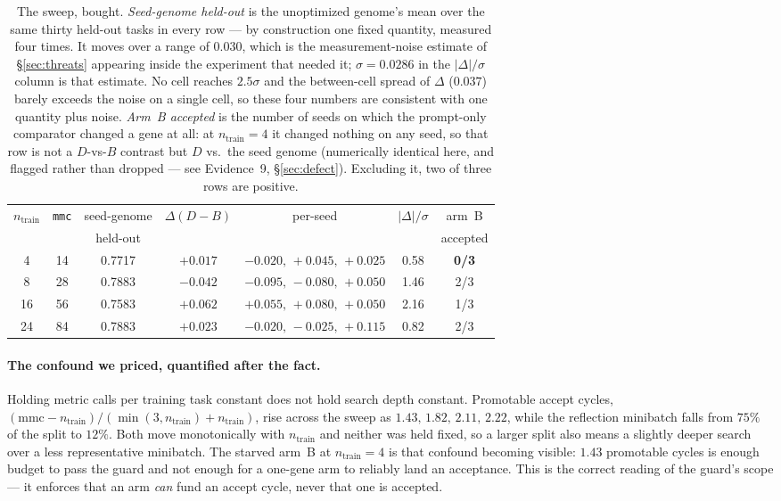 \documentclass[11pt]{article}
\newcommand{\dd}{\ensuremath{\Delta}}
\begin{document}
\begin{table}[h]
\centering
\small
\begin{tabular}{ccccccc}
\toprule
$n_{\mathrm{train}}$ & \texttt{mmc} & seed-genome & $\dd(D-B)$ & per-seed & $|\dd|/\sigma$ & arm~B \\
 & & held-out & & & & accepted \\
\midrule
4  & 14 & 0.7717 & $+0.017$ & $-0.020,\,+0.045,\,+0.025$ & 0.58 & \textbf{0/3} \\
8  & 28 & 0.7883 & $-0.042$ & $-0.095,\,-0.080,\,+0.050$ & 1.46 & 2/3 \\
16 & 56 & 0.7583 & $+0.062$ & $+0.055,\,+0.080,\,+0.050$ & 2.16 & 1/3 \\
24 & 84 & 0.7883 & $+0.023$ & $-0.020,\,-0.025,\,+0.115$ & 0.82 & 2/3 \\
\bottomrule
\end{tabular}
\caption{The sweep, bought. \emph{Seed-genome held-out} is the unoptimized genome's mean over
the same thirty held-out tasks in every row --- by construction one fixed quantity, measured
four times. It moves over a range of $0.030$, which is the measurement-noise estimate of
\S\ref{sec:threats} appearing inside the experiment that needed it; $\sigma = 0.0286$ in the
$|\dd|/\sigma$ column is that estimate. No cell reaches $2.5\sigma$ and the between-cell
spread of $\dd$ ($0.037$) barely exceeds the noise on a single cell, so these four numbers are
consistent with one quantity plus noise. \emph{Arm~B accepted} is the number of seeds on which
the prompt-only comparator changed a gene at all: at $n_{\mathrm{train}}{=}4$ it changed
nothing on any seed, so that row is not a $D$-vs-$B$ contrast but $D$ vs.\ the seed genome
(numerically identical here, and flagged rather than dropped --- see Evidence~9,
\S\ref{sec:defect}). Excluding it, two of three rows are positive.}
\label{tab:splitresults}
\end{table}

\paragraph{The confound we priced, quantified after the fact.} Holding metric calls per
training task constant does not hold search depth constant. Promotable accept cycles,
$(\mathrm{mmc} - n_{\mathrm{train}})/(\min(3,n_{\mathrm{train}}) + n_{\mathrm{train}})$, rise
across the sweep as $1.43,\,1.82,\,2.11,\,2.22$, while the reflection minibatch falls from
$75\%$ of the split to $12\%$. Both move monotonically with $n_{\mathrm{train}}$ and neither
was held fixed, so a larger split also means a slightly deeper search over a less
representative minibatch. The starved arm~B at $n_{\mathrm{train}}{=}4$ is that confound
becoming visible: $1.43$ promotable cycles is enough budget to pass the guard and not enough
for a one-gene arm to reliably land an acceptance. This is the correct reading of the guard's
scope --- it enforces that an arm \emph{can} fund an accept cycle, never that one is accepted.
\end{document}
